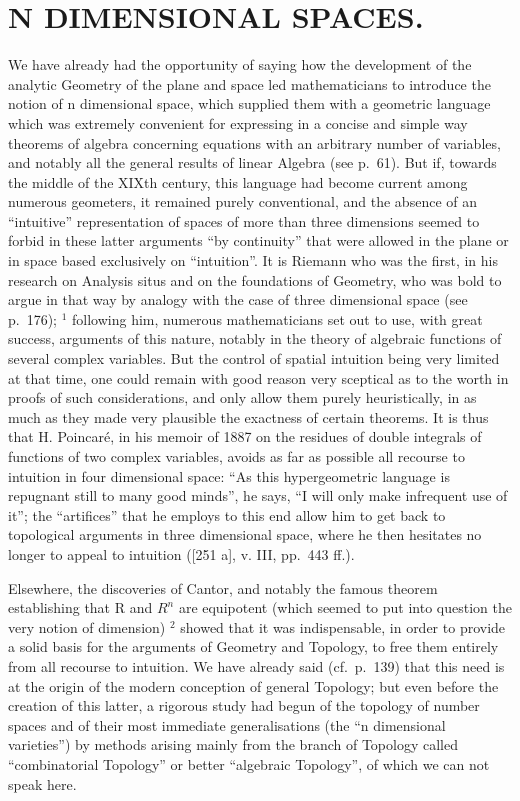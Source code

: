 \chapter{N DIMENSIONAL SPACES.}

We have already had the opportunity of saying how the development of the analytic Geometry of the plane and space led mathematicians to introduce the notion of n dimensional space, which supplied them with a geometric language which was extremely convenient for expressing in a concise and simple way theorems of algebra concerning equations with an arbitrary number of variables, and notably all the general results of linear Algebra (see p.~61). But if, towards the middle of the XIXth century, this language had become current among numerous geometers, it remained purely conventional, and the absence of an ``intuitive'' representation of spaces of more than three dimensions seemed to forbid in these latter arguments ``by continuity'' that were allowed in the plane or in space based exclusively on ``intuition''. It is Riemann who was the first, in his research on Analysis situs and on the foundations of Geometry, who was bold to argue in that way by analogy with the case of three dimensional space (see p.~176); \(^{1}\) following him, numerous mathematicians set out to use, with great success, arguments of this nature, notably in the theory of algebraic functions of several complex variables. But the control of spatial intuition being very limited at that time, one could remain with good reason very sceptical as to the worth in proofs of such considerations, and only allow them purely heuristically, in as much as they made very plausible the exactness of certain theorems. It is thus that H. Poincaré, in his memoir of 1887 on the residues of double integrals of functions of two complex variables, avoids as far as possible all recourse to intuition in four dimensional space: ``As this hypergeometric language is repugnant still to many good minds'', he says, ``I will only make infrequent use of it''; the ``artifices'' that he employs to this end allow him to get back to topological arguments in three dimensional space, where he then hesitates no longer to appeal to intuition ({[}251 a{]}, v. III, pp.~443 ff.).

Elsewhere, the discoveries of Cantor, and notably the famous theorem establishing that R and \(R^{n}\) are equipotent (which seemed to put into question the very notion of dimension) \(^{2}\) showed that it was indispensable, in order to provide a solid basis for the arguments of Geometry and Topology, to free them entirely from all recourse to intuition. We have already said (cf.~p.~139) that this need is at the origin of the modern conception of general Topology; but even before the creation of this latter, a rigorous study had begun of the topology of number spaces and of their most immediate generalisations (the ``n dimensional varieties'') by methods arising mainly from the branch of Topology called ``combinatorial Topology'' or better ``algebraic Topology'', of which we can not speak here.
\relax{}

